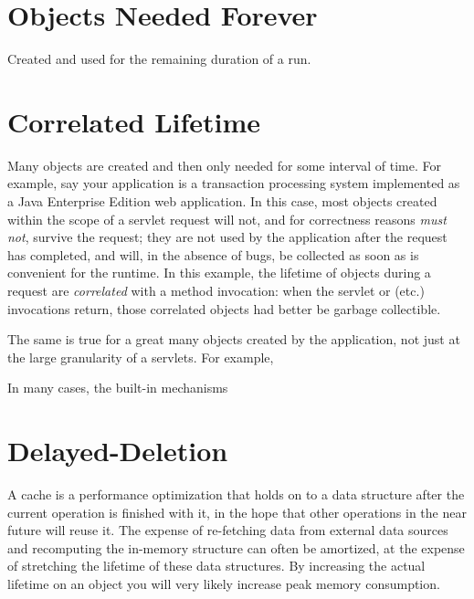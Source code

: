 




\section{Objects Needed Forever}

Created and used for the remaining duration of a run.


\section{Correlated Lifetime}

Many objects are created and then only needed for some interval of time. For
example, say your application is a transaction processing system implemented as
a Java Enterprise Edition web application. In this case, most objects
created within the scope of a servlet request will not, and for correctness
reasons {\em must not}, survive the request; they are not used by the 
application after the request has completed, and will, in the absence of bugs,
be collected as soon as is convenient for the runtime. In this example, the
lifetime of objects during a request are {\em correlated} with a method
invocation: when the servlet  or  (etc.) invocations
return, those correlated objects had better be garbage collectible.

The same is true for a great many objects created by the application, not just
at the large granularity of a servlets. For example,

In many cases, the built-in mechanisms 

\section{Delayed-Deletion}

A cache is a performance optimization that holds on to a data structure after the
current operation is finished with it, in the hope that other operations in the
near future will reuse it. The expense of re-fetching data from external data
sources and recomputing the in-memory structure can often be amortized, at the
expense of stretching the lifetime of these data structures. By increasing the
actual lifetime on an object you will very likely increase peak memory
consumption.




